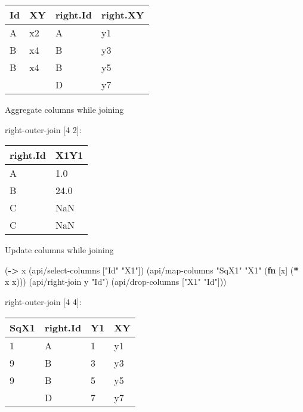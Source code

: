 \documentclass[]{article}
\newenvironment{Shaded}{\begin{snugshade}}{\end{snugshade}}
\newcommand{\KeywordTok}[1]{\textcolor[rgb]{0.13,0.29,0.53}{\textbf{#1}}}
\newcommand{\NormalTok}[1]{#1}
\newcommand{\StringTok}[1]{\textcolor[rgb]{0.31,0.60,0.02}{#1}}
\newcommand{\VariableTok}[1]{\textcolor[rgb]{0.00,0.00,0.00}{#1}}
\begin{document}
\begin{longtable}[]{@{}llll@{}}
\toprule
Id & XY & right.Id & right.XY\tabularnewline
\midrule
\endhead
A & x2 & A & y1\tabularnewline
B & x4 & B & y3\tabularnewline
B & x4 & B & y5\tabularnewline
& & D & y7\tabularnewline
\bottomrule
\end{longtable}

Aggregate columns while joining

\begin{Shaded}
\end{Shaded}

right-outer-join {[}4 2{]}:

\begin{longtable}[]{@{}ll@{}}
\toprule
right.Id & X1Y1\tabularnewline
\midrule
\endhead
A & 1.0\tabularnewline
B & 24.0\tabularnewline
C & NaN\tabularnewline
C & NaN\tabularnewline
\bottomrule
\end{longtable}

Update columns while joining

\begin{Shaded}
\begin{Highlighting}[]
\NormalTok{(}\KeywordTok{->}\NormalTok{ x}
\NormalTok{    (api/select-columns [}\StringTok{"Id"} \StringTok{"X1"}\NormalTok{])}
\NormalTok{    (api/map-columns }\StringTok{"SqX1"} \StringTok{"X1"}\NormalTok{ (}\KeywordTok{fn}\NormalTok{ [x] (}\KeywordTok{*}\NormalTok{ x x)))}
\NormalTok{    (api/right-join y }\StringTok{"Id"}\NormalTok{)}
\NormalTok{    (api/drop-columns [}\StringTok{"X1"} \StringTok{"Id"}\NormalTok{]))}
\end{Highlighting}
\end{Shaded}

right-outer-join {[}4 4{]}:

\begin{longtable}[]{@{}llll@{}}
\toprule
SqX1 & right.Id & Y1 & XY\tabularnewline
\midrule
\endhead
1 & A & 1 & y1\tabularnewline
9 & B & 3 & y3\tabularnewline
9 & B & 5 & y5\tabularnewline
& D & 7 & y7\tabularnewline
\bottomrule
\end{longtable}
\end{document}

